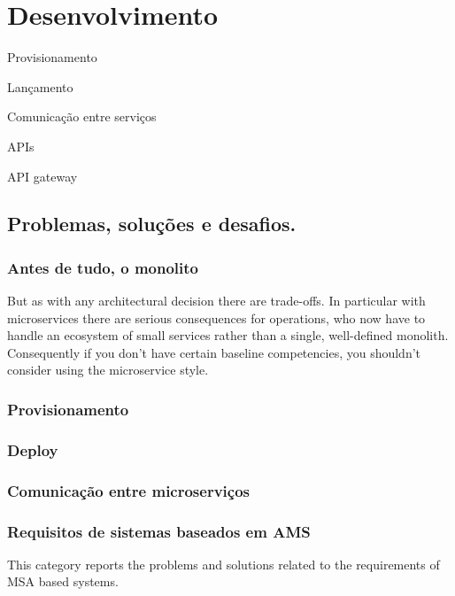 \chapter{Desenvolvimento}

Provisionamento

Lançamento

Comunicação entre serviços

APIs

API gateway

\section{Problemas, soluções e desafios.}

\subsection{Antes de tudo, o monolito}

\begin{citacao}
But as with any architectural decision there are trade-offs. In particular with microservices there are serious consequences for operations, who now have to handle an ecosystem of small services rather than a single, well-defined monolith. Consequently if you don't have certain baseline competencies, you shouldn't consider using the microservice style. \cite{MartinFowlerMicroservices}
\end{citacao}


\subsection{Provisionamento}

\subsection{Deploy}

\subsection{Comunicação entre microserviços}

\subsection*{Requisitos de sistemas baseados em AMS}





This category reports the problems and solutions related to the requirements of MSA based systems. 

